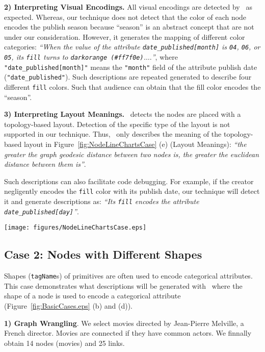 \textbf{2) Interpreting Visual Encodings.} All visual encodings are detected by \ApproachName~as expected.
Whereas, our technique does not detect that the color of each node encodes the publish season because ``season'' is an abstract concept that are not under our consideration.
However, it generates the mapping of different color categories: 
\textit{``When the value of the attribute {\texttt{date\_published[month]}} is {\texttt{04}}, {\texttt{06}}, or {\texttt{05}}, 
its {\texttt{fill}} turns to {\texttt{darkorange (\#ff7f0e)}}.$\ldots$''}, 
where \texttt{"date\_published[month]"} means the \texttt{"month"} field of the attribute publish date (\texttt{"date\_published"}).
Such descriptions are repeated generated to describe four different \texttt{fill} colors.
Such that audience can obtain that the fill color encodes the ``season''.

\textbf{3) Interpreting Layout Meanings.} \ApproachName~detects the nodes are placed with a topology-based layout. 
Detection of the specific type of the layout is not supported in our technique.
Thus, \ApproachName~only describes the meaning of the topology-based layout in Figure~\ref{fig:NodeLineChartsCase} (e) (Layout Meanings): \textit{``the greater the graph geodesic distance between two nodes is, the greater the euclidean distance between them is''}.

Such descriptions can also facilitate code debugging. 
For example, if the creator negligently encodes the \texttt{fill} color with its publish date,
our technique will detect it and generate descriptions as: \textit{``Its \texttt{fill} encodes the attribute \texttt{date\_published[day]}''}.

\begin{figure*}[ht]
    \centering
    \setlength{\belowcaptionskip}{-5pt}
    \texttt{[image: figures/NodeLineChartsCase.eps]}
    \caption{xxx}
    \label{fig:NodeLineChartsCase}
\end{figure*}

\subsection{Case 2: Nodes with Different Shapes}
Shapes (\texttt{tagName}s) of primitives are often used to encode categorical attributes.
This case demonstrates what descriptions will be generated with \ApproachName~where the shape of a node is used to encode a categorical attribute (Figure~\ref{fig:BasicCases.eps} (b) and (d)).

\textbf{1) Graph Wrangling}. 
We select movies directed by Jean-Pierre Melville, a French director. 
Movies are connected if they have common actors. 
We finnally obtain 14 nodes (movies) and 25 links.

